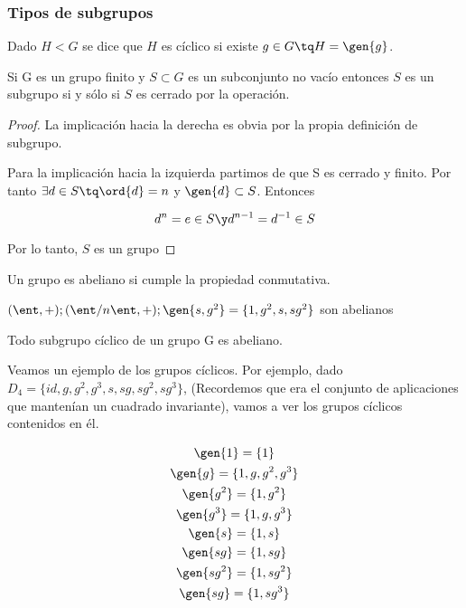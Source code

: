 \documentclass[nochap]{apuntes}
\begin{document}
\subsubsection{Tipos de subgrupos}
\begin{defn}
   Dado $H<G$ se dice que $H$ es cíclico si existe $g\in G \tq H=\gen{g}$.
  \end{defn}

  \begin{theorem}
   Si G es un grupo finito y $S\subset G$ es un subconjunto no vacío entonces $S$ es un subgrupo si y sólo si $S$ es cerrado por la operación.
  \end{theorem}

  \begin{proof}
   La implicación hacia la derecha es obvia por la propia definición de subgrupo.

   Para la implicación hacia la izquierda partimos de que S es cerrado y finito. Por tanto $\exists d \in S \tq \ord{d}=n$ y $\gen{d} \subset S$. Entonces

\[ d^{n}=e\in S \y d^{n-1}=d^{-1}\in S\]

Por lo tanto, $S$ es un grupo
  \end{proof}

  \begin{defn}
   Un grupo es abeliano si cumple la propiedad conmutativa.
  \end{defn}

  \begin{example}  $(\ent, +); (\ent/n\ent, +); \gen{s,g^{2}} =\{1,g^{2},s,sg^{2}\}$ son abelianos
  \end{example}

  \begin{lemma}
   Todo subgrupo cíclico de un grupo G es abeliano.
  \end{lemma}

Veamos un ejemplo de los grupos cíclicos. Por ejemplo, dado $D_{4}=\{id, g, g^{2}, g^{3}, s, sg, sg^{2},sg^{3}\}$, (Recordemos que era el conjunto de aplicaciones que mantenían un cuadrado invariante), vamos a ver los grupos cíclicos contenidos en él.

  \begin{gather*}
  \gen{1}=\{1\} \\
  \gen{g} =\{1,g,g^{2}, g^{3}\}\\
  \gen{g^{2}}=\{1,g^{2}\}\\
  \gen{g^{3}}=\{1,g, g^{3}\}\\
  \gen{s} =\{1,s\}\\
  \gen{sg}=\{1, sg\}\\
  \gen{sg^{2}} =\{1, sg^{2}\}\\
  \gen{sg}=\{1, sg^{3}\}
  \end{gather*}
\end{document}
